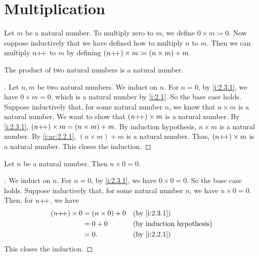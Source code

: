\section{Multiplication}\label{i:sec:2.3}

\begin{defn}\label{i:2.3.1}
  Let \(m\) be a natural number.
  To multiply zero to \(m\), we define \(0 \times m \coloneqq 0\).
  Now suppose inductively that we have defined how to multiply \(n\) to \(m\).
  Then we can multiply \(n{+}\!{+}\) to \(m\) by defining \((n{+}\!{+}) \times m \coloneqq (n \times m) + m\).
\end{defn}

\begin{ac}\label{i:ac:2.3.1}
  The product of two natural numbers is a natural number.
\end{ac}

\begin{proof}[]
  Let \(n, m\) be two natural numbers.
  We induct on \(n\).
  For \(n = 0\), by \cref{i:2.3.1}, we have \(0 \times m = 0\), which is a natural number by \cref{i:2.1}.
  So the base case holds.
  Suppose inductively that, for some natural number \(n\), we know that \(n \times m\) is a natural number.
  We want to show that \((n{+}\!{+}) \times m\) is a natural number.
  By \cref{i:2.3.1}, \((n{+}\!{+}) \times m = (n \times m) + m\).
  By induction hypothesis, \(n \times m\) is a natural number.
  By \cref{i:ac:2.2.1}, \((n \times m) + m\) is a natural number.
  Thus, \((n{+}\!{+}) \times m\) is a natural number.
  This closes the induction.
\end{proof}

\begin{ac}\label{i:ac:2.3.2}
  Let \(n\) be a natural number.
  Then \(n \times 0 = 0\).
\end{ac}

\begin{proof}[]
  We induct on \(n\).
  For \(n = 0\), by \cref{i:2.3.1}, we have \(0 \times 0 = 0\).
  So the base case holds.
  Suppose inductively that, for some natural number \(n\), we have \(n \times 0 = 0\).
  Then, for \(n{+}\!{+}\), we have
  \begin{align*}
    (n\pp) \times 0 & = (n \times 0) + 0 &  & \by{i:2.3.1} \\
                    & = 0 + 0            &  & \byIH        \\
                    & = 0.               &  & \by{i:2.2.1}
  \end{align*}
  This closes the induction.
\end{proof}

